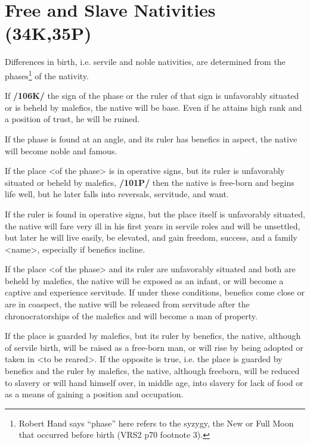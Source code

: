 \section{Free and Slave Nativities (34K,35P)}
Differences in birth, i.e. servile and noble nativities, are determined from the phases\footnote{Robert Hand says ``phase'' here refers to the syzygy, the New or Full Moon that occurred before birth (VRS2 p70 footnote 3).} of the nativity.

If \textbf{/106K/} the sign of the phase or the ruler of that sign is unfavorably situated or is beheld by malefics, the
native will be base. Even if he attains high rank and a position of trust, he will be ruined. 

If the phase is found at an angle, and its ruler has benefics in aspect, the native will become noble and famous. 

If the place <of the phase> is in operative signs, but its ruler is unfavorably situated or beheld by malefics, \textbf{/101P/} then the native is free-born and begins life well, but he later falls into reversals, servitude, and want. 

If \mndl the ruler is found in operative signs, but the place itself is unfavorably situated, the native will fare very ill in his first years in servile roles and will be unsettled, but later he will live easily, be elevated, and gain freedom, success, and a family <name>, especially if benefics incline. 

If the place <of the phase> and its ruler are unfavorably situated and both are beheld by malefics, the native will be exposed as an infant, or will become a captive and experience servitude. If under these conditions, benefics come close or are in coaspect, the native will be released from servitude after the chronocratorships of the malefics and will become
a man of property. 

If the place is guarded by malefics, but its ruler by benefics, the native, although of servile birth, will be raised as a free-born man, or will rise by being adopted or taken in <to be reared>. If the opposite is true, i.e. the place is guarded by benefics and the ruler by malefics, the native, although freeborn, will be reduced to slavery or will hand himself over, in middle age, into slavery for lack of food or as a means of gaining a position and occupation.

\newpage